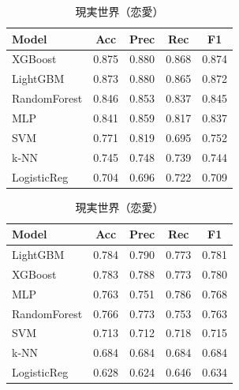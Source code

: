 \documentclass[uplatex, dvipdfmx, 11pt, a4paper, report]{jsbook}
\begin{document}
\begin{table}[H]
  \small
  \begin{minipage}[t]{0.49\textwidth}
    \centering
    \caption{異世界（恋愛）}
    \begin{tabular}{l|c|c|c|c} \hline
      Model & Acc & Prec & Rec & F1 \\ \hline
      XGBoost & 0.875 & 0.880 & 0.868 & 0.874 \\
      LightGBM & 0.873 & 0.880 & 0.865 & 0.872 \\
      RandomForest & 0.846 & 0.853 & 0.837 & 0.845 \\
      MLP & 0.841 & 0.859 & 0.817 & 0.837 \\
      SVM & 0.771 & 0.819 & 0.695 & 0.752 \\
      k-NN & 0.745 & 0.748 & 0.739 & 0.744 \\
      LogisticReg & 0.704 & 0.696 & 0.722 & 0.709 \\ \hline
    \end{tabular}
  \end{minipage}
  \hfill
  \begin{minipage}[t]{0.49\textwidth}
    \centering
    \caption{現実世界（恋愛）}
    \begin{tabular}{l|c|c|c|c} \hline
      Model & Acc & Prec & Rec & F1 \\ \hline
      LightGBM & 0.784 & 0.790 & 0.773 & 0.781 \\
      XGBoost & 0.783 & 0.788 & 0.773 & 0.780 \\
      MLP & 0.763 & 0.751 & 0.786 & 0.768 \\
      RandomForest & 0.766 & 0.773 & 0.753 & 0.763 \\
      SVM & 0.713 & 0.712 & 0.718 & 0.715 \\
      k-NN & 0.684 & 0.684 & 0.684 & 0.684 \\
      LogisticReg & 0.628 & 0.624 & 0.646 & 0.634 \\ \hline
    \end{tabular}
  \end{minipage}
\end{table}
\end{document}
